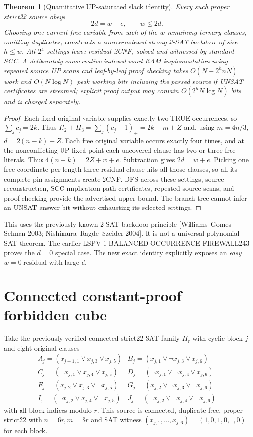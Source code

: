 \documentclass[10pt]{article}
\newtheorem{theorem}{Theorem}
\begin{document}
\begin{theorem}[Quantitative UP-saturated slack identity]
Every such proper strict22 source obeys
\[
\boxed{2d=w+e,\qquad w\le 2d.}
\]
Choosing one current free variable from each of the $w$ remaining ternary clauses, omitting duplicates, constructs a source-indexed strong 2-SAT backdoor of size $h\le w$. All $2^h$ settings leave residual 2CNF, solved and witnessed by standard SCC. A deliberately conservative indexed-word-RAM implementation using repeated source UP scans and leaf-by-leaf proof checking takes $O(N+2^h nN)$ work and $O(N\log N)$ peak working bits including the parsed source if UNSAT certificates are streamed; explicit proof output may contain $O(2^hN\log N)$ bits and is charged separately.
\end{theorem}
\begin{proof}
Each fixed original variable supplies exactly two TRUE occurrences, so $\sum_j c_j=2k$. Thus $H_2+H_3=\sum_j(c_j-1)_+=2k-m+Z$ and, using $m=4n/3$, $d=2(n-k)-Z$. Each free original variable occurs exactly four times, and at the nonconflicting UP fixed point each uncovered clause has two or three free literals. Thus $4(n-k)=2Z+w+e$. Subtraction gives $2d=w+e$. Picking one free coordinate per length-three residual clause hits all those clauses, so all its complete pin assignments create 2CNF. DFS across these settings, source reconstruction, SCC implication-path certificates, repeated source scans, and proof checking provide the advertised upper bound. The branch tree cannot infer an UNSAT answer bit without exhausting its selected settings.
\end{proof}
This uses the previously known 2-SAT backdoor principle [Williams--Gomes--Selman 2003; Nishimura--Ragde--Szeider 2004]. It is not a universal polynomial SAT theorem. The earlier LSPV-1 BALANCED-OCCURRENCE-FIREWALL243 proves the $d=0$ special case. The new exact identity explicitly exposes an \emph{easy} $w=0$ residual with large $d$.

\section*{Connected constant-proof forbidden cube}
Take the previously verified connected strict22 SAT family $H_r$ with cyclic block $j$ and eight original clauses
\[
\begin{array}{ll}
A_j=(x_{j-1,1}\vee x_{j,3}\vee x_{j,5})&
B_j=(x_{j,1}\vee\neg x_{j,3}\vee x_{j,6})\\
C_j=(\neg x_{j,1}\vee x_{j,4}\vee x_{j,5})&
D_j=(\neg x_{j,1}\vee\neg x_{j,4}\vee x_{j,6})\\
E_j=(x_{j,2}\vee x_{j,3}\vee\neg x_{j,5})&
G_j=(x_{j,2}\vee\neg x_{j,3}\vee\neg x_{j,6})\\
I_j=(\neg x_{j,2}\vee x_{j,4}\vee\neg x_{j,5})&
J_j=(\neg x_{j,2}\vee\neg x_{j,4}\vee\neg x_{j,6})
\end{array}
\]
with all block indices modulo $r$. This source is connected, duplicate-free, proper strict22 with $n=6r,m=8r$ and SAT witness $(x_{j,1},\ldots,x_{j,6})=(1,0,1,0,1,0)$ for each block.
\end{document}
